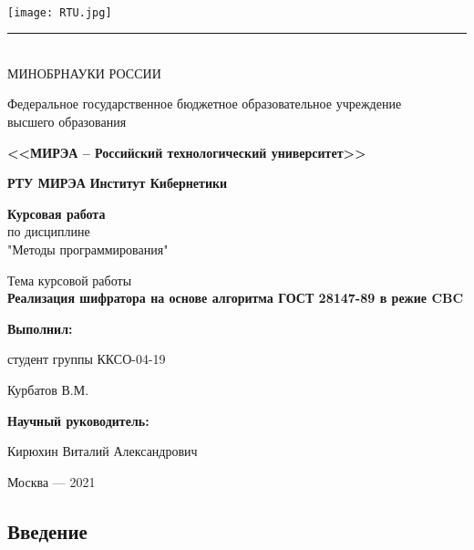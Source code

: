 \documentclass[oneside,final,14pt]{extreport}
\begin{document}
\thispagestyle{empty}
~\vspace{-2cm}\setlength{\parindent}{0cm}
\begin{center}
		\texttt{[image: RTU.jpg]}\\[2pt]
		\hrule{}\mbox{}\\[14pt]
		
		МИНОБРНАУКИ РОССИИ
		
		Федеральное государственное бюджетное образовательное учреждение\\
		высшего образования
		
		\textbf{<<МИРЭА – Российский технологический университет>>}
		
		\textbf{\large РТУ МИРЭА}
		\vfill	
		\textbf{\large Институт Кибернетики}
		
		\textbf{\large Курсовая работа}\\ по дисциплине\\ "Методы программирования"
		
		

		
		\large Тема курсовой работы\\ \textbf{Реализация шифратора на основе алгоритма ГОСТ 28147-89 в режие CBC}
		
		
\end{center}
\vfill
\begin{flushright}
\textbf{Выполнил:}


студент группы ККСО-04-19


Курбатов В.М.


\textbf{Научный руководитель:}


Кирюхин Виталий Александрович
\end{flushright}

	
	\vfill
	\begin{center}
	Москва --- 2021
	\end{center}



\tableofcontents
\newpage

\begin{center}



 \section*{Введение}
 
 \end{center}
\end{document}
